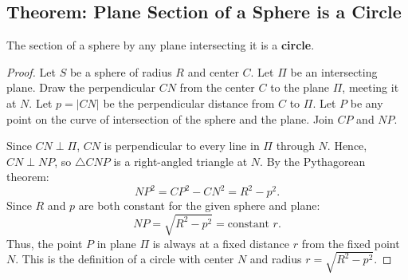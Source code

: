 \subsection{Theorem: Plane Section of a Sphere is a Circle}
\begin{theorembox}
The section of a sphere by any plane intersecting it is a \textbf{circle}.
\end{theorembox}

\begin{proof}
Let $S$ be a sphere of radius $R$ and center $C$.
Let $\Pi$ be an intersecting plane.
Draw the perpendicular $CN$ from the center $C$ to the plane $\Pi$, meeting it at $N$.
Let $p = |CN|$ be the perpendicular distance from $C$ to $\Pi$.
Let $P$ be any point on the curve of intersection of the sphere and the plane. Join $CP$ and $NP$.

\begin{center}
\end{center}

Since $CN \perp \Pi$, $CN$ is perpendicular to every line in $\Pi$ through $N$.
Hence, $CN \perp NP$, so $\triangle C NP$ is a right-angled triangle at $N$.
By the Pythagorean theorem:
\begin{equation}
    NP^2 = CP^2 - CN^2 = R^2 - p^2.
\end{equation}
Since $R$ and $p$ are both constant for the given sphere and plane:
\begin{equation}
    NP = \sqrt{R^2 - p^2} = \text{constant } r.
\end{equation}
Thus, the point $P$ in plane $\Pi$ is always at a fixed distance $r$ from the fixed point $N$.
This is the definition of a circle with center $N$ and radius $r = \sqrt{R^2 - p^2}$.
\end{proof}

